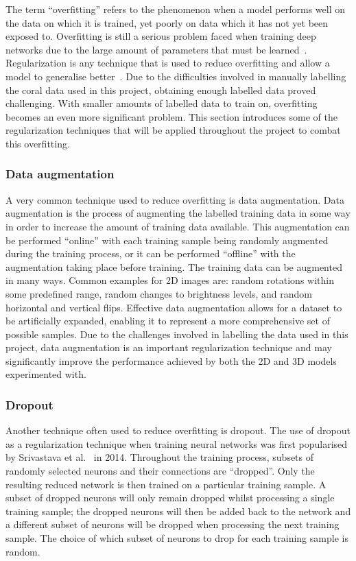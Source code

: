 The term ``overfitting'' refers to the phenomenon when a model performs well on the data on which it is trained, yet poorly on data which it has not yet been exposed to. Overfitting is still a serious problem faced when training deep networks due to the large amount of parameters that must be learned~\cite{dropout, reducing, overfitavoid}. Regularization is any technique that is used to reduce overfitting and allow a model to generalise better~\cite{regular}. Due to the difficulties involved in manually labelling the coral data used in this project, obtaining enough labelled data proved challenging. With smaller amounts of labelled data to train on, overfitting becomes an even more significant problem. This section introduces some of the regularization techniques that will be applied throughout the project to combat this overfitting.

\subsubsection{Data augmentation}

A very common technique used to reduce overfitting is data augmentation. Data augmentation is the process of augmenting the labelled training data in some way in order to increase the amount of training data available. This augmentation can be performed ``online'' with each training sample being randomly augmented during the training process, or it can be performed ``offline'' with the augmentation taking place before training. The training data can be augmented in many ways. Common examples for 2D images are: random rotations within some predefined range, random changes to brightness levels, and random horizontal and vertical flips. Effective data augmentation allows for a dataset to be artificially expanded, enabling it to represent a more comprehensive set of possible samples. Due to the challenges involved in labelling the data used in this project, data augmentation is an important regularization technique and may significantly improve the performance achieved by both the 2D and 3D models experimented with.

\subsubsection{Dropout}

Another technique often used to reduce overfitting is dropout. The use of dropout as a regularization technique when training neural networks was first popularised by Srivastava et al.~\cite{dropout} in 2014. Throughout the training process, subsets of randomly selected neurons and their connections are ``dropped''. Only the resulting reduced network is then trained on a particular training sample. A subset of dropped neurons will only remain dropped whilst processing a single training sample; the dropped neurons will then be added back to the network and a different subset of neurons will be dropped when processing the next training sample. The choice of which subset of neurons to drop for each training sample is random. 


